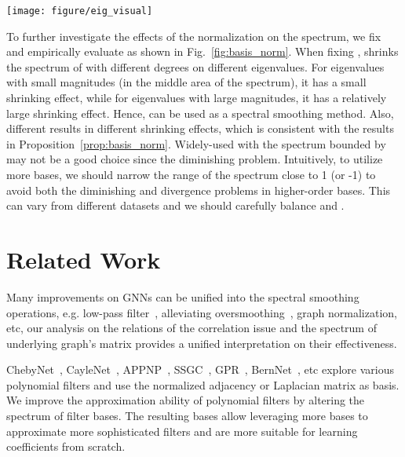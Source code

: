 \documentclass[nohyperref]{article}
\theoremstyle{plain}
\theoremstyle{definition}
\theoremstyle{remark}
\begin{document}
\begin{figure*}[th]
	\centering
	\texttt{[image: figure/eig\_visual]}
	\vspace{-20pt}
	\caption{We use the metric  to evaluate the shrinking effects of  on the spectrum. We randomly sample 5 graphs in each of three datasets ZINC, MolPCBA and NCI1 respectively. In the first three figures, we use the fixed  on all 5 graphs. In the fourth figure, we use  respectively on one graph, which corresponds to the 5 lines from top to bottom.
	More visualization results on other datasets can be found in Appendix~\ref{spectrum_visualizations}.}
	\label{fig:basis_norm}
	\vspace{-10pt}
\end{figure*}
To further investigate the effects of the normalization on the  spectrum, we fix  and empirically evaluate  as shown in Fig.~\ref{fig:basis_norm}.
When fixing ,  shrinks the spectrum of  with different degrees on different eigenvalues.
For eigenvalues with small magnitudes (in the middle area of the spectrum), it has a small shrinking effect, while for eigenvalues with large magnitudes, it has a relatively large shrinking effect.
Hence,  can be used as a spectral smoothing method.
Also, different  results in different shrinking effects, which is consistent with the results in Proposition~\ref{prop:basis_norm}.
Widely-used  with the spectrum bounded by  may not be a good choice since the diminishing problem.
Intuitively, to utilize more bases, we should narrow the range of the spectrum close to 1 (or -1) to avoid both the diminishing and divergence problems in higher-order bases.
This can vary from different datasets and we should carefully balance  and .

\section{Related Work}

Many improvements on GNNs can be unified into the spectral smoothing operations, e.g. low-pass filter~\cite{pmlr-v97-wu19e,zhu2021interpreting,klicpera_predict_2019,klicpera2019diffusion,chien2021adaptive,balcilar2021analyzing}, alleviating oversmoothing~\cite{chenWHDL2020gcnii,xu2018representation,liu2020towards,li2018deeper}, graph normalization\cite{cai2020graphnorm}, etc, our analysis on the relations of the correlation issue and the spectrum of underlying graph's matrix provides a unified interpretation on their effectiveness.

ChebyNet~\cite{defferrard2016convolutional}, CayleNet~\cite{8521593}, APPNP~\cite{klicpera_predict_2019}, SSGC~\cite{zhu2020simple}, GPR~\cite{chien2021adaptive}, BernNet~\cite{he2021bernnet}, etc explore various polynomial filters and use the normalized adjacency or Laplacian matrix as basis.
We improve the approximation ability of polynomial filters by altering the spectrum of filter bases.
The resulting bases allow leveraging more bases to approximate more sophisticated filters and are more suitable for learning coefficients from scratch.
\end{document}
